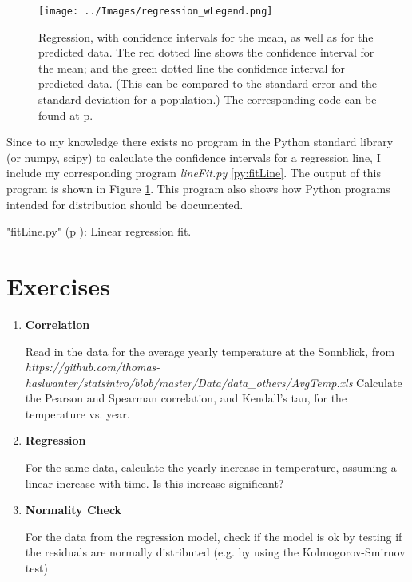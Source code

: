 \begin{figure}
  \centering
  \texttt{[image: ../Images/regression\_wLegend.png]}\\
  \caption{Regression, with confidence intervals for the mean, as well as for the predicted data. The red dotted line shows the confidence interval for the mean; and the green dotted line the confidence interval for predicted data. (This can be compared to the standard error and the standard deviation for a population.) The corresponding code can be found
  at p. \pageref{py:fitLine}} \label{fig:regline}
\end{figure}

Since to my knowledge there exists no program in the Python standard library (or numpy, scipy) to calculate the confidence intervals for a regression line, I include my corresponding program \emph{lineFit.py} \ref{py:fitLine}. The output of this program is shown in Figure \ref{fig:regline}. This program also shows how Python programs intended for distribution should be documented.

\PyImg "fitLine.py" (p \pageref{py:fitLine}): Linear regression fit.

\section{Exercises}

\begin{enumerate}
  \item \textbf{Correlation}

    Read in the data for the average yearly temperature at the Sonnblick, from     \emph{https://github.com/thomas-haslwanter/statsintro/blob/master/Data/data\_others/AvgTemp.xls}
    Calculate the Pearson and Spearman correlation, and Kendall's tau, for the temperature vs. year.

  \item \textbf{Regression}

    For the same data, calculate the yearly increase in temperature, assuming a linear increase with time.
    Is this increase significant?

  \item \textbf{Normality Check}

    For the data from the regression model, check if the model is ok by testing if the residuals are normally distributed (e.g. by using the Kolmogorov-Smirnov test)

\end{enumerate}


